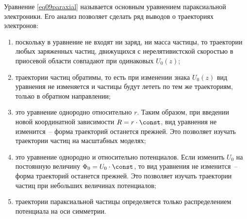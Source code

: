 Уравнение \eqref{eq09paraxial} называется основным уравнением параксиальной
электроники. Его анализ позволяет сделать ряд выводов о траекториях электронов:
\begin{enumerate}
  \item поскольку в уравнение не входят ни заряд, ни масса частицы, то
    траектории любых заряженных частиц, движущихся с нерелятивистской скоростью
    в приосевой области совпадают при одинаковых \( U_0(z) \);
  \item траектории частиц обратимы, то есть при изменении знака \( U_0(z) \) вид
    уравнения не изменяется и частицы будут лететь по тем же траекториям, только
    в обратном направлении;
  \item это уравнение однородно относительно \( r \). Таким образом, при
    введении новой координатной зависимости \( R = r\cdot\const \), вид
    уравнения не изменится~-- форма траекторий останется прежней. Это позволяет
    изучать траектории частиц на масштабных моделях;
  \item это уравнение однородно и относительно потенциалов. Если изменить
    \( U_0 \) на постоянную величину \( \Phi_0 = U_0\cdot\const \), то вид
    уравнения не изменится~-- форма траекторий останется прежней. Это позволяет
    изучать траектории частиц при небольших величинах потенциалов;
  \item траектории параксиальной частицы определяется только распределением
    потенциала на оси симметрии.
\end{enumerate}
